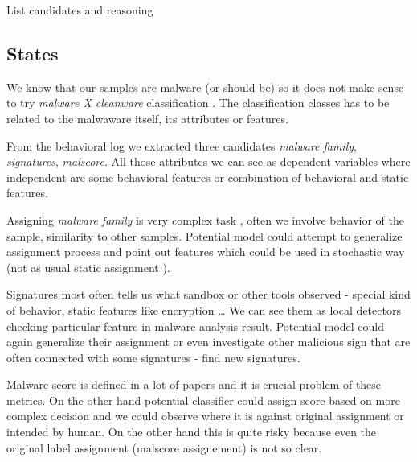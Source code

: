 List candidates and reasoning

\subsection{States}
We know that our samples are malware (or should be)  so it does not make sense to try \emph{malware X cleanware} classification . The classification classes has to be related to the malwaware itself, its attributes or features.

From the behavioral log we extracted three candidates \emph{malware family}, \emph{signatures}, \emph{malscore}. All those attributes we can see as dependent variables where independent are some behavioral features or combination of behavioral and static features. 

Assigning \emph{malware family} is very complex task , often we involve behavior of the sample, similarity to other samples. Potential model could attempt to generalize  assignment process and point out features which could be used in stochastic way (not as usual static assignment ). 

Signatures most often tells us what sandbox or other tools observed - special kind of behavior, static features like encryption \dots {} We can see them as local detectors checking particular feature in malware analysis result. Potential model could again generalize their assignment or even investigate other malicious sign that are often connected with some signatures - find new signatures.

Malware score is defined in a lot of papers  and it is crucial problem of these metrics. On the other hand potential classifier could assign score based on more complex decision and we could observe where it is against original assignment or intended by human. On the other hand this is quite risky because even the original label assignment (malscore assignement) is not so clear.


